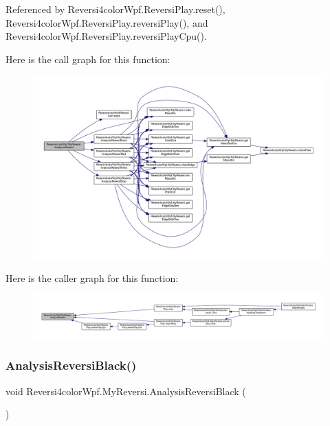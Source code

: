 Referenced by Reversi4color\+Wpf.\+Reversi\+Play.\+reset(), Reversi4color\+Wpf.\+Reversi\+Play.\+reversi\+Play(), and Reversi4color\+Wpf.\+Reversi\+Play.\+reversi\+Play\+Cpu().

Here is the call graph for this function\+:
\nopagebreak
\begin{figure}[H]
\begin{center}
\leavevmode
\includegraphics[width=350pt]{class_reversi4color_wpf_1_1_my_reversi_a228ec7c4ed93d7207aebb824906ccc2e_cgraph}
\end{center}
\end{figure}
Here is the caller graph for this function\+:
\nopagebreak
\begin{figure}[H]
\begin{center}
\leavevmode
\includegraphics[width=350pt]{class_reversi4color_wpf_1_1_my_reversi_a228ec7c4ed93d7207aebb824906ccc2e_icgraph}
\end{center}
\end{figure}
\mbox{\label{class_reversi4color_wpf_1_1_my_reversi_af3e53dce82787cfdad079a37c2c73f61}} 
\subsubsection{\texorpdfstring{Analysis\+Reversi\+Black()}{AnalysisReversiBlack()}}
{\footnotesize\ttfamily void Reversi4color\+Wpf.\+My\+Reversi.\+Analysis\+Reversi\+Black (\begin{DoxyParamCaption}{ }\end{DoxyParamCaption})\hspace{0.3cm}{\ttfamily [private]}}



